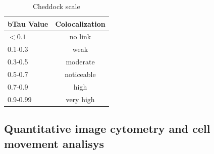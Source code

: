 \documentclass[english,authoryear]{elsarticle}
\begin{document}
\begin{table}[h]
  \caption{Cheddock scale}
  \label{cheddock}
\centering
\begin{tabular}{l|c|}
  bTau Value & Colocalization \\
 \hline
 $ <0.1 $ & no link \\
 0.1-0.3 & weak \\
 0.3-0.5 & moderate \\
 0.5-0.7 & noticeable \\
 0.7-0.9 & high \\
 0.9-0.99 & very high
\end{tabular}
\end{table}



\subsection{Quantitative image cytometry and cell movement analisys}
\end{document}
